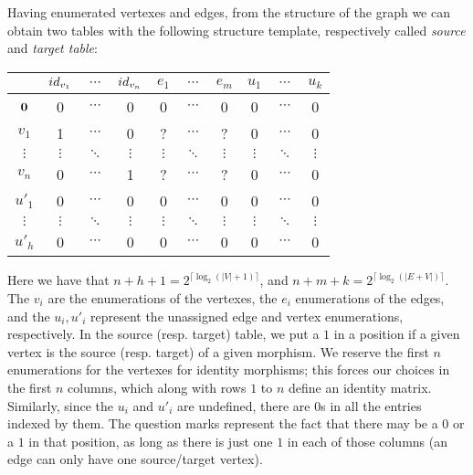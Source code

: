 \documentclass[preliminary,copyright,creativecommons,sharealike,noncommercial]{eptcs}
\begin{document}
Having enumerated vertexes and edges, from the structure of 
the graph we can obtain two tables with the following structure 
template, respectively called \emph{source} and \emph{target table}:
%
%
\begin{center}\scriptsize
  \begin{tabular}{c|ccccccccc}
                  & $id_{v_1}$ & $\cdots$ & $id_{v_n}$ & $e_1$     & $\cdots$ & $e_m$    & $u_1$     & $\cdots$ & $u_k$   \\
  \hline
  $\textbf{0}$   & 0                 & $\cdots$ & 0                  & 0             & $\cdots$ & 0             & 0             & $\cdots$ & 0             \\
  $v_1$      & 1                 & $\cdots$ & 0                  & ?             & $\cdots$ & ?             & 0             & $\cdots$ & 0             \\
  $\vdots $ & $\vdots$     & $\ddots$ & $\vdots$      & $\vdots$ & $\ddots$ & $\vdots$ & $\vdots$ & $\ddots$ & $\vdots$  \\
  $v_n$      & 0                 & $\cdots$ & 1                  & ?             & $\cdots$ & ?             & 0             & $\cdots$ & 0             \\
  $u'_1$     & 0                 & $\cdots$ & 0                  & 0             & $\cdots$ & 0             & 0             & $\cdots$ & 0             \\
  $\vdots$  & $\vdots$     & $\ddots$ & $\vdots$      & $\vdots$ & $\ddots$ & $\vdots$ & $\vdots$ & $\ddots$ & $\vdots$ \\
  $u'_h$     & 0                 & $\cdots$ & 0                  & 0             & $\cdots$ &0             & 0             & $\cdots$ & 0             \\
  \end{tabular}
\end{center}
%
Here we have that $n+h+1 = 2^{\lceil \log_2 (|V|+1) \rceil}$, 
and $n+m+k = 2^{\lceil \log_2 (|E+V|) \rceil}$. The $v_i$ are 
the enumerations of the vertexes, the $e_i$ enumerations 
of the edges, and the $u_i, u'_i$ represent the unassigned 
edge and vertex enumerations, respectively. In the source (resp. target) 
table, we put a $1$ in a position if a given vertex is the source (resp. target)
of a given morphism. We reserve the first $n$ enumerations for the 
vertexes for identity morphisms; this forces our 
choices in the first $n$ columns, which along with rows $1$ to $n$ 
define an identity matrix. Similarly, since the $u_i$ and 
$u'_i$ are undefined, there are $0$s in all the entries indexed by them.
The question marks represent the fact that there may be a $0$ or a $1$
in that position, as long as there is just one $1$ in each of those 
columns (an edge can only have one source/target vertex). 
%
%
%
\end{document}
